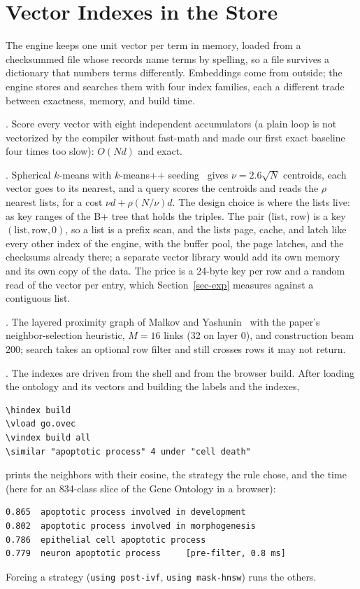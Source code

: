 \section{Vector Indexes in the Store}
\label{sec-index}

The engine keeps one unit vector per term in memory, loaded from a checksummed file
whose records name terms by spelling, so a file survives a dictionary that numbers
terms differently.
Embeddings come from outside; the engine stores and searches them with four index
families, each a different trade between exactness, memory, and build time.

.
Score every vector with eight independent accumulators (a plain loop is not
vectorized by the compiler without fast-math and made our first exact baseline four
times too slow): $O(Nd)$ and exact.

.
Spherical $k$-means with $k$-means++ seeding~\cite{arthur2007} gives $\nu=2.6\sqrt{N}$
centroids, each vector goes to its nearest, and a query scores the centroids and
reads the $\rho$ nearest lists, for a cost $\nu d+\rho (N/\nu) d$.
The design choice is where the lists live: as key ranges of the B+ tree that holds the
triples.
The pair (list, row) is a key $(\mathrm{list},\mathrm{row},0)$, so a list is a prefix
scan, and the lists page, cache, and latch like every other index of the engine, with
the buffer pool, the page latches, and the checksums already there; a separate vector
library would add its own memory and its own copy of the data.
The price is a 24-byte key per row and a random read of the vector per entry, which
Section~\ref{sec-exp} measures against a contiguous list.

.
The layered proximity graph of Malkov and Yashunin~\cite{malkov2020} with the paper's
neighbor-selection heuristic, $M{=}16$ links (32 on layer 0), and construction beam
200; search takes an optional row filter and still crosses rows it may not return.

.
The indexes are driven from the shell and from the browser build.
After loading the ontology and its vectors and building the labels and the indexes,
\begin{small}\begin{verbatim}
\hindex build
\vload go.ovec
\vindex build all
\similar "apoptotic process" 4 under "cell death"
\end{verbatim}\end{small}
prints the neighbors with their cosine, the strategy the rule chose, and the time
(here for an 834-class slice of the Gene Ontology in a browser):
\begin{small}\begin{verbatim}
0.865  apoptotic process involved in development
0.802  apoptotic process involved in morphogenesis
0.786  epithelial cell apoptotic process
0.779  neuron apoptotic process     [pre-filter, 0.8 ms]
\end{verbatim}\end{small}
Forcing a strategy (\texttt{using post-ivf}, \texttt{using mask-hnsw}) runs the others.

